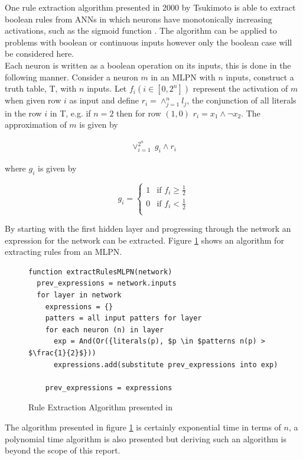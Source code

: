 One rule extraction algorithm presented in 2000 by Tsukimoto is able to extract boolean rules from ANNs in which neurons have monotonically increasing activations, such as the sigmoid function \cite{tsukimoto2000extracting}. The algorithm can be applied to problems with boolean or continuous inputs however only the boolean case will be considered here.\\

Each neuron is written as a boolean operation on its inputs, this is done in the following manner. Consider a neuron $m$ in an MLPN with $n$ inputs, construct a truth table, T, with $n$ inputs. Let $f_i (i \in [0, 2^n])$ represent the activation of $m$ when given row $i$ as input and define $r_i = \land_{j=1}^{n} l_j$, the conjunction of all literals in the row $i$ in T, e.g. if $n=2$ then for row $(1,0)$ $r_i = x_1 \land \lnot x_2$. The approximation of $m$ is given by 

\begin{align}
	\lor_{i=1}^{2^n}\ g_i \land r_i
\end{align}

where $g_i$ is given by

\[
g_i =
\begin{cases}
1 & \text{if $f_i \geq \frac{1}{2}$} \\
0 & \text{if $f_i < \frac{1}{2}$} \\
\end{cases}
\]

By starting with the first hidden layer and progressing through the network an expression for the network can be extracted. Figure \ref{alg:rule-extraction-tsukimoto} shows an algorithm for extracting rules from an MLPN.

\begin{figure}[H]
\begin{lstlisting}[mathescape=true]
function extractRulesMLPN(network)
  prev_expressions = network.inputs
  for layer in network
    expressions = {}
    patters = all input patters for layer
    for each neuron (n) in layer
      exp = And(Or({literals(p), $p \in $patterns n(p) > $\frac{1}{2}$}))
      expressions.add(substitute prev_expressions into exp)
	  
    prev_expressions = expressions
\end{lstlisting}
	\caption{Rule Extraction Algorithm presented in \cite{tsukimoto2000extracting}}
	\label{alg:rule-extraction-tsukimoto}
\end{figure}

The algorithm presented in figure \ref{alg:rule-extraction-tsukimoto} is certainly exponential time in terms of $n$, a polynomial time algorithm is also presented but deriving such an algorithm is beyond the scope of this report.\\


